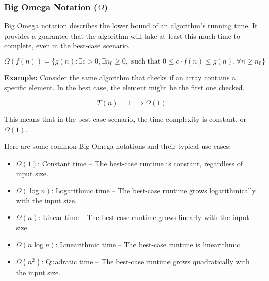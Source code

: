 \documentclass[12pt]{book} %
\begin{document}
\subsubsection{Big Omega Notation ($\Omega$)}

Big Omega notation describes the lower bound of an algorithm's running time. It provides a guarantee that the algorithm will take at least this much time to complete, even in the best-case scenario.

\[
\Omega(f(n)) = \{ g(n) : \exists c > 0, \exists n_0 \geq 0, \text{ such that } 0 \leq c \cdot f(n) \leq g(n), \forall n \geq n_0 \}
\]

\textbf{Example:} Consider the same algorithm that checks if an array contains a specific element. In the best case, the element might be the first one checked.

\[
T(n) = 1 \implies \Omega(1)
\]

This means that in the best-case scenario, the time complexity is constant, or $\Omega(1)$.


Here are some common Big Omega notations and their typical use cases:
\begin{itemize}
    \item $\Omega(1)$: Constant time – The best-case runtime is constant, regardless of input size.
    \item $\Omega(\log n)$: Logarithmic time – The best-case runtime grows logarithmically with the input size.
    \item $\Omega(n)$: Linear time – The best-case runtime grows linearly with the input size.
    \item $\Omega(n \log n)$: Linearithmic time – The best-case runtime is linearithmic.
    \item $\Omega(n^2)$: Quadratic time – The best-case runtime grows quadratically with the input size.
\end{itemize}

\end{document}
